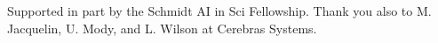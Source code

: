 \begin{acks}
Supported in part by the Schmidt AI in Sci Fellowship.
Thank you also to M. Jacquelin, U. Mody, and L. Wilson at Cerebras Systems.
\end{acks}
